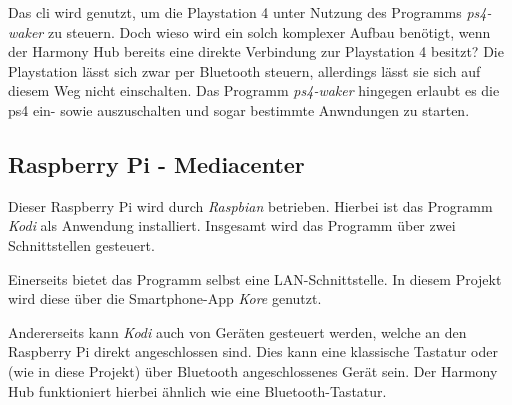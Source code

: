 Das \ac{cli} wird genutzt, um die Playstation 4 unter Nutzung des Programms \textit{ps4-waker}\cite{dhleongp12:online} zu steuern.
Doch wieso wird ein solch komplexer Aufbau benötigt, wenn der Harmony Hub bereits eine direkte Verbindung zur Playstation 4 besitzt?
Die Playstation lässt sich zwar per Bluetooth steuern, allerdings lässt sie sich auf diesem Weg nicht einschalten.
Das Programm \textit{ps4-waker} hingegen erlaubt es die \ac{ps4} ein- sowie auszuschalten und sogar bestimmte Anwndungen zu starten.

\subsection{Raspberry Pi - Mediacenter}\label{sec:aufbau-mediacenter}
Dieser Raspberry Pi wird durch \textit{Raspbian} betrieben.
Hierbei ist das Programm \textit{Kodi} als Anwendung installiert.
Insgesamt wird das Programm über zwei Schnittstellen gesteuert.

Einerseits bietet das Programm selbst eine LAN-Schnittstelle.
In diesem Projekt wird diese über die Smartphone-App \textit{Kore} genutzt.

Andererseits kann \textit{Kodi} auch von Geräten gesteuert werden, welche an den Raspberry Pi direkt angeschlossen sind.
Dies kann eine klassische Tastatur oder (wie in diese Projekt) über Bluetooth angeschlossenes Gerät sein.
Der Harmony Hub funktioniert hierbei ähnlich wie eine Bluetooth-Tastatur.